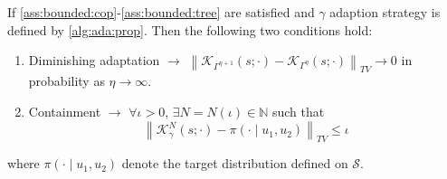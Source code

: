 \documentclass[
12pt]{article}
\newenvironment{manualtheorem}[1]{%
	\IfBlankTF{#1}
	{\renewcommand{\themanualtheoreminner}{\unskip}}
	{\renewcommand\themanualtheoreminner{#1}}%
	\manualtheoreminner
}{\endmanualtheoreminner}
\begin{document}
	\begin{manualtheorem}{4.1}
		If \cref{ass:bounded:cop}-\cref{ass:bounded:tree} are satisfied and $\gamma$ adaption strategy is defined by \cref{alg:ada:prop}. Then the following two conditions hold:
		\begin{enumerate}
			\item Diminishing adaptation $\rightarrow$ $\left\|\mathcal{K}_{\Gamma^{\eta+1}}(s;\cdot)-\mathcal{K}_{\Gamma^{\eta}}(s;\cdot)\right\|_{TV}\to 0$ in probability as $\eta\to \infty$.
			\item Containment $\rightarrow$ $\forall\iota>0$, $\exists N = N(\iota)\in \mathbb{N}$ such that 
			\begin{equation*}
				\left\|\mathcal{K}^N_{\gamma}(s;\cdot) - \pi(\cdot\mid u_1,u_2)\right\|_{TV} \le \iota
			\end{equation*}
		\end{enumerate}
		where $\pi(\cdot\mid u_1, u_2)$ denote the target distribution defined on $\mathcal{S}$.
	\end{manualtheorem}
	
\end{document}
